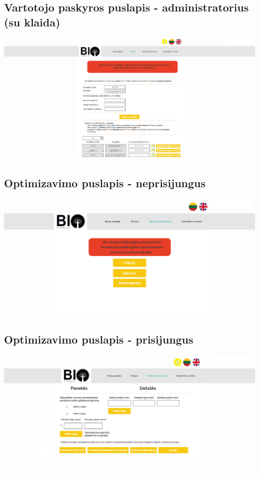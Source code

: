 \documentclass[a4paper,12pt]{article}
\begin{document}
\subsection{Vartotojo paskyros puslapis - administratorius (su klaida)}
\hspace{-2cm}
\includegraphics[scale=0.5]{interfeisai/paskyrosPuslapisAdministratoriusSuKlaida}

\subsection{Optimizavimo puslapis - neprisijungus}
\hspace{-2cm}
\includegraphics[scale=0.5]{interfeisai/optimizavimoPuslapisNeprisijungus}

\subsection{Optimizavimo puslapis - prisijungus}
\hspace{-2cm}
\includegraphics[scale=0.5]{interfeisai/optimizavimoPuslapisPrisijungus}
\end{document}
